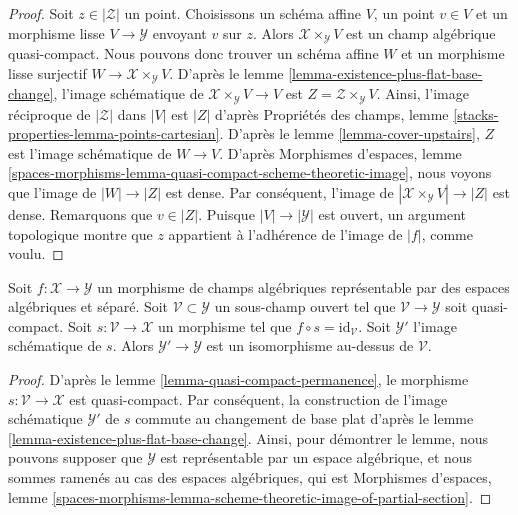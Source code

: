 \begin{proof}
Soit $z \in |\mathcal{Z}|$ un point.
Choisissons un schéma affine $V$, un point $v \in V$ et un morphisme lisse
$V \to \mathcal{Y}$ envoyant $v$ sur $z$.
Alors $\mathcal{X} \times_\mathcal{Y} V$ est un champ algébrique quasi-compact.
Nous pouvons donc trouver un schéma affine $W$ et un morphisme lisse
surjectif $W \to \mathcal{X} \times_\mathcal{Y} V$.
D'après le lemme \ref{lemma-existence-plus-flat-base-change},
l'image schématique de
$\mathcal{X} \times_\mathcal{Y} V \to V$ est
$Z = \mathcal{Z} \times_\mathcal{Y} V$.
Ainsi, l'image réciproque de $|\mathcal{Z}|$ dans $|V|$ est $|Z|$ d'après
Propriétés des champs, lemme \ref{stacks-properties-lemma-points-cartesian}.
D'après le lemme \ref{lemma-cover-upstairs}, $Z$ est
l'image schématique de $W \to V$.
D'après Morphismes d'espaces, lemme
\ref{spaces-morphisms-lemma-quasi-compact-scheme-theoretic-image},
nous voyons que l'image de $|W| \to |Z|$ est dense.
Par conséquent, l'image de $|\mathcal{X} \times_\mathcal{Y} V| \to |Z|$
est dense. Remarquons que $v \in |Z|$.
Puisque $|V| \to |\mathcal{Y}|$ est ouvert, un argument topologique
montre que $z$ appartient à l'adhérence de l'image de $|f|$, comme voulu.
\end{proof}

\begin{lemma}
\label{lemma-scheme-theoretic-image-of-partial-section}
Soit $f : \mathcal{X} \to \mathcal{Y}$ un morphisme de champs algébriques
représentable par des espaces algébriques et séparé.
Soit $\mathcal{V} \subset \mathcal{Y}$ un sous-champ ouvert tel que
$\mathcal{V} \to \mathcal{Y}$ soit quasi-compact.
Soit $s : \mathcal{V} \to \mathcal{X}$ un morphisme tel que
$f \circ s = \text{id}_\mathcal{V}$.
Soit $\mathcal{Y}'$ l'image schématique de $s$.
Alors $\mathcal{Y}' \to \mathcal{Y}$ est un isomorphisme au-dessus de $\mathcal{V}$.
\end{lemma}

\begin{proof}
D'après le lemme \ref{lemma-quasi-compact-permanence},
le morphisme $s : \mathcal{V} \to \mathcal{X}$ est quasi-compact.
Par conséquent, la construction de l'image schématique $\mathcal{Y}'$
de $s$ commute au changement de base plat d'après
le lemme \ref{lemma-existence-plus-flat-base-change}.
Ainsi, pour démontrer le lemme,
nous pouvons supposer que $\mathcal{Y}$ est représentable par un espace algébrique,
et nous sommes ramenés au cas des espaces algébriques, qui est
Morphismes d'espaces, lemme
\ref{spaces-morphisms-lemma-scheme-theoretic-image-of-partial-section}.
\end{proof}






